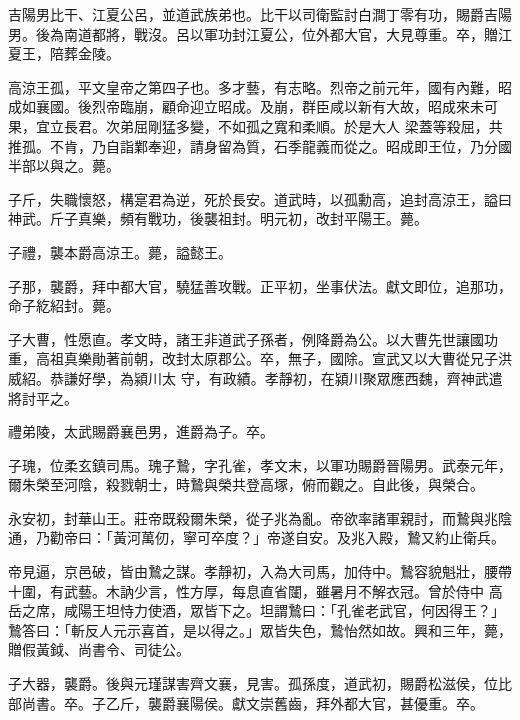 \begin{pinyinscope}
 吉陽男比干、江夏公呂，並道武族弟也。比干以司衛監討白澗丁零有功，賜爵吉陽男。後為南道都將，戰沒。呂以軍功封江夏公，位外都大官，大見尊重。卒，贈江夏王，陪葬金陵。



 高涼王孤，平文皇帝之第四子也。多才藝，有志略。烈帝之前元年，國有內難，昭成如襄國。後烈帝臨崩，顧命迎立昭成。及崩，群臣咸以新有大故，昭成來未可果，宜立長君。次弟屈剛猛多變，不如孤之寬和柔順。於是大人
 梁蓋等殺屈，共推孤。不肯，乃自詣鄴奉迎，請身留為質，石季龍義而從之。昭成即王位，乃分國半部以與之。薨。



 子斤，失職懷怒，構寔君為逆，死於長安。道武時，以孤勳高，追封高涼王，謚曰神武。斤子真樂，頻有戰功，後襲祖封。明元初，改封平陽王。薨。



 子禮，襲本爵高涼王。薨，謚懿王。



 子那，襲爵，拜中都大官，驍猛善攻戰。正平初，坐事伏法。獻文即位，追那功，命子紇紹封。薨。



 子大曹，性愿直。孝文時，諸王非道武子孫者，例降爵為公。以大曹先世讓國功重，高祖真樂勛著前朝，改封太原郡公。卒，無子，國除。宣武又以大曹從兄子洪威紹。恭謙好學，為潁川太
 守，有政績。孝靜初，在潁川聚眾應西魏，齊神武遣將討平之。



 禮弟陵，太武賜爵襄邑男，進爵為子。卒。



 子瑰，位柔玄鎮司馬。瑰子鷙，字孔雀，孝文末，以軍功賜爵晉陽男。武泰元年，爾朱榮至河陰，殺戮朝士，時鷙與榮共登高塚，俯而觀之。自此後，與榮合。



 永安初，封華山王。莊帝既殺爾朱榮，從子兆為亂。帝欲率諸軍親討，而鷙與兆陰通，乃勸帝曰：「黃河萬仞，寧可卒度？」帝遂自安。及兆入殿，鷙又約止衛兵。



 帝見逼，京邑破，皆由鷙之謀。孝靜初，入為大司馬，加侍中。鷙容貌魁壯，腰帶十圍，有武藝。木訥少言，性方厚，每息直省闥，雖暑月不解衣冠。曾於侍中
 高岳之席，咸陽王坦恃力使酒，眾皆下之。坦謂鷙曰：「孔雀老武官，何因得王？」鷙答曰：「斬反人元示喜首，是以得之。」眾皆失色，鷙怡然如故。興和三年，薨，贈假黃鉞、尚書令、司徒公。



 子大器，襲爵。後與元瑾謀害齊文襄，見害。孤孫度，道武初，賜爵松滋侯，位比部尚書。卒。子乙斤，襲爵襄陽侯。獻文崇舊齒，拜外都大官，甚優重。卒。




\end{pinyinscope}
